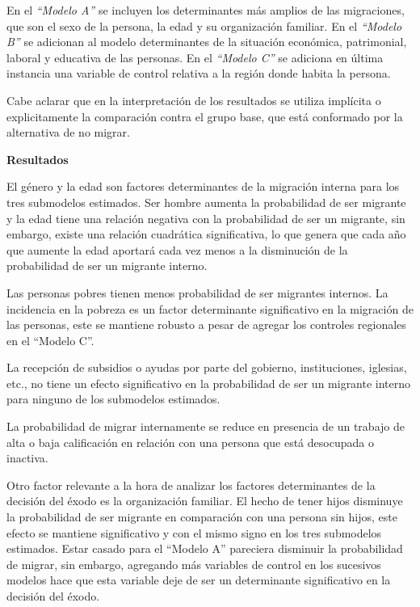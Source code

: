 \documentclass[12pt,a4paper]{article}
\begin{document}
En el \textit{``Modelo A''} se incluyen los determinantes más amplios de las migraciones, que son el sexo de la persona, la edad y su organización familiar.
En el \textit{``Modelo B''} se adicionan al modelo determinantes de la situación económica, patrimonial, laboral y educativa de las personas.
En el \textit{``Modelo C''} se adiciona en última instancia una variable de control relativa a la región donde habita la persona.

Cabe aclarar que en la interpretación de los resultados se utiliza implícita o explicitamente la comparación contra el grupo base, que está conformado por la alternativa de no migrar.

\textbf{Resultados}

El género y la edad son factores determinantes de la migración interna para los tres submodelos estimados. Ser hombre aumenta la probabilidad de ser migrante y la edad tiene una relación negativa con la probabilidad de ser un migrante, sin embargo, existe una relación cuadrática significativa, lo que genera que cada año que aumente la edad aportará cada vez menos a la disminución de  la probabilidad de ser un migrante interno.

Las personas pobres tienen menos probabilidad de ser migrantes internos. La incidencia en la pobreza es un factor determinante significativo en la migración de las personas, este se mantiene robusto a pesar de agregar los controles regionales en el ``Modelo C''. 

La recepción de subsidios o ayudas por parte del gobierno, instituciones, iglesias, etc., no tiene un efecto significativo en la probabilidad de ser un migrante interno para ninguno de los submodelos estimados. 

La probabilidad de migrar internamente se reduce en presencia de un trabajo de alta o baja calificación en relación con una persona que está desocupada o inactiva.

Otro factor relevante a la hora de analizar los factores determinantes de la decisión del éxodo es la organización familiar. El hecho de tener hijos disminuye la probabilidad de ser migrante en comparación con una persona sin hijos, este efecto se mantiene significativo y con el mismo signo en los tres submodelos estimados. Estar casado para el ``Modelo A'' pareciera disminuir la probabilidad de migrar, sin embargo, agregando más variables de control en los sucesivos modelos hace que esta variable deje de ser un determinante significativo en la decisión del éxodo.
\end{document}
